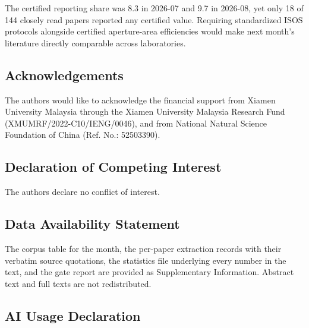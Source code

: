 \documentclass[
  11pt,
]{article}
\begin{document}
The certified reporting share was 8.3 in 2026-07 and 9.7 in 2026-08, yet
only 18 of 144 closely read papers reported any certified value.
Requiring standardized ISOS protocols alongside certified aperture-area
efficiencies would make next month's literature directly comparable
across laboratories.

\subsection{Acknowledgements}\label{acknowledgements}

The authors would like to acknowledge the financial support from Xiamen
University Malaysia through the Xiamen University Malaysia Research Fund
(XMUMRF/2022-C10/IENG/0046), and from National Natural Science
Foundation of China (Ref. No.: 52503390).

\subsection{Declaration of Competing
Interest}\label{declaration-of-competing-interest}

The authors declare no conflict of interest.

\subsection{Data Availability
Statement}\label{data-availability-statement}

The corpus table for the month, the per-paper extraction records with
their verbatim source quotations, the statistics file underlying every
number in the text, and the gate report are provided as Supplementary
Information. Abstract text and full texts are not redistributed.

\subsection{AI Usage Declaration}\label{ai-usage-declaration}
\end{document}
